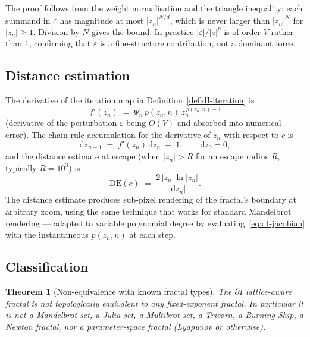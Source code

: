 \documentclass[11pt,a4paper]{article}
\newtheorem{theorem}{Theorem}[section]
\theoremstyle{definition}
\theoremstyle{remark}
\begin{document}
The proof follows from the weight normalisation and the triangle inequality: each summand in $\varepsilon$ has magnitude at most $|z_{n}|^{N/d}$, which is never larger than $|z_{n}|^{N}$ for $|z_{n}|\geq 1$. Division by $N$ gives the bound. In practice $|\varepsilon|/|z|^{p}$ is of order $V$ rather than $1$, confirming that $\varepsilon$ is a fine-structure contribution, not a dominant force.

\subsection{Distance estimation}

The derivative of the iteration map in Definition~\ref{def:dI-iteration} is
\begin{equation}
f'(z_{n}) \;=\; \Psi_{n}\,p(z_{n},n)\,z_{n}^{\,p(z_{n},n)-1}
\label{eq:dI-jacobian}
\end{equation}
(derivative of the perturbation $\varepsilon$ being $O(V)$ and absorbed into numerical error). The chain-rule accumulation for the derivative of $z_{n}$ with respect to $c$ is
\begin{equation}
\mathrm{d}z_{n+1} \;=\; f'(z_{n})\,\mathrm{d}z_{n} \;+\; 1, \qquad \mathrm{d}z_{0}=0,
\end{equation}
and the distance estimate at escape (when $|z_{n}|>R$ for an escape radius $R$, typically $R=10^{3}$) is
\begin{equation}
\mathrm{DE}(c) \;=\; \frac{2\,|z_{n}|\ln|z_{n}|}{|\mathrm{d}z_{n}|}.
\label{eq:dI-DE}
\end{equation}
The distance estimate produces sub-pixel rendering of the fractal's boundary at arbitrary zoom, using the same technique that works for standard Mandelbrot rendering --- adapted to variable polynomial degree by evaluating~\eqref{eq:dI-jacobian} with the instantaneous $p(z_{n},n)$ at each step.

\subsection{Classification}

\begin{theorem}[Non-equivalence with known fractal types]\label{thm:dI-novel}
The $\partial I$ lattice-aware fractal is not topologically equivalent to any fixed-exponent fractal. In particular it is not a Mandelbrot set, a Julia set, a Multibrot set, a Tricorn, a Burning Ship, a Newton fractal, nor a parameter-space fractal (Lyapunov or otherwise).
\end{theorem}
\end{document}
